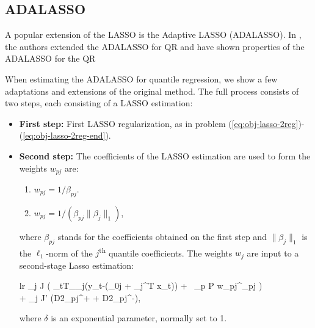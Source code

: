 \subsection{ADALASSO}
A popular extension of the LASSO is the Adaptive LASSO (ADALASSO). In \cite{ciuperca_adaptive_2016}, the authors extended the ADALASSO for QR and have shown properties of the ADALASSO for the QR 

When estimating the ADALASSO for quantile regression, we show a few adaptations and extensions of the original method. The full process consists of two steps, each consisting of a LASSO estimation:
\begin{itemize}
	\item \textbf{First step:} First LASSO regularization, as in problem (\ref{eq:obj-lasso-2reg})-(\ref{eq:obj-lasso-2reg-end}).
	
	\item \textbf{Second step:} The coefficients of the LASSO estimation are used to form the weights $w_{pj}$  are:
	\begin{enumerate}
		\item $w_{pj} = 1/ \beta_{pj}$.
		\item $w_{pj} = 1/ (\beta_{pj} \parallel \beta_j \parallel_1)$,
	\end{enumerate}
	where $\beta_{pj}$ stands for the coefficients obtained on the first step and $\parallel \beta_j \parallel_1$ is the $\ell_1$-norm of the $j$\textsuperscript{th} quantile coefficients.
	The weights $w_j$ are input to a second-stage Lasso estimation:
	\begin{IEEEeqnarray*}{lr}
		 \sum_{j \in J} \left( \sum_{t\in T}\rho_{\alpha_j}(y_{t}-(\beta_{0j} + \beta_j^T x_t)) + \lambda\  \sum_{p \in P} w_{pj}^\delta \mid  \beta_{pj} \mid \right) \span \\
		\span + \gamma \sum_{j \in J'} (D2_{pj}^+ + D2_{pj}^-),
	\end{IEEEeqnarray*}
	where $\delta$ is an exponential parameter, normally set to 1.
\end{itemize}

